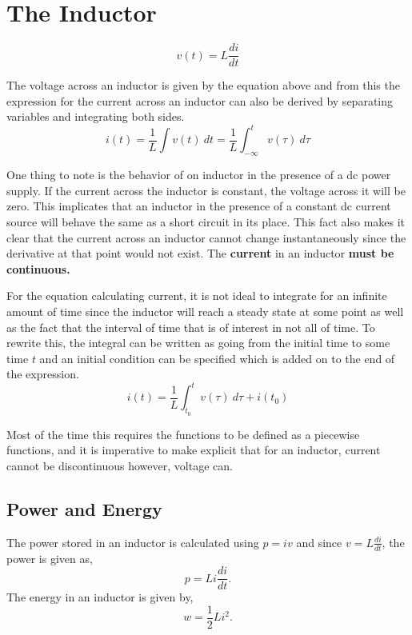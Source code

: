 \documentclass[12pt]{article}
\begin{document}
    \section*{The Inductor}
    \[
        v(t) = L \frac{di}{dt}
    \]
    \par The voltage across an inductor is given by the equation above and from
    this the expression for the current across an inductor can also be derived
    by separating variables and integrating both sides.
    \[
        i(t) = \frac{1}{L} \int v(t)\ dt = \frac{1}{L} \int_{-\infty}^t v(\tau)\
        d\tau
    \]
    \par One thing to note is the behavior of on inductor in the presence of a
    dc power supply. If the current across the inductor is constant, the voltage
    across it will be zero. This implicates that an inductor in the presence of
    a constant dc current source will behave the same as a short circuit in its
    place. This fact also makes it clear that the current across an inductor
    cannot change instantaneously since the derivative at that point would not
    exist. The \textbf{current} in an inductor \textbf{must be continuous.}
    \par For the equation calculating current, it is not ideal to integrate for
    an infinite amount of time since the inductor will reach a steady state at
    some point as well as the fact that the interval of time that is of interest
    in not all of time. To rewrite this, the integral can be written as going
    from the initial time to some time $t$ and an initial condition can be
    specified which is added on to the end of the expression.
    \[
        i(t) = \frac{1}{L} \int_{t_0}^t v(\tau)\ d\tau + i(t_0)
    \]
    \par Most of the time this requires the functions to be defined as a
    piecewise functions, and it is imperative to make explicit that for an
    inductor, current cannot be discontinuous however, voltage can.
    \subsection*{Power and Energy}
    The power stored in an inductor is calculated using $p=iv$ and since
    $v = L \frac{di}{dt}$, the power is given as,
    \[
        p = Li \frac{di}{dt}
    .\]
    The energy in an inductor is given by,
    \[
        w = \frac{1}{2} Li^2
    .\]
    \newpage
\end{document}
